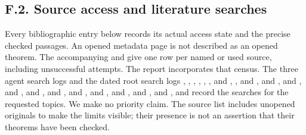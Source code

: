 \subsection{F.2. Source access and literature searches}
Every bibliographic entry below records its actual access state and the
precise checked passages. An opened metadata page is not described as
an opened theorem. The accompanying 
and  give one row per named or used source,
including unsuccessful attempts. The report incorporates that census.
The three agent search logs and the dated root search logs
, ,
, ,
, , and
, , and
, and
, and
, and
, and
, and
, and
, and
, and
, and
, and
, and
record the searches for the requested topics. We make no priority claim.
The source list includes unopened originals to make the limits visible;
their presence is not an assertion that their theorems have been checked.
